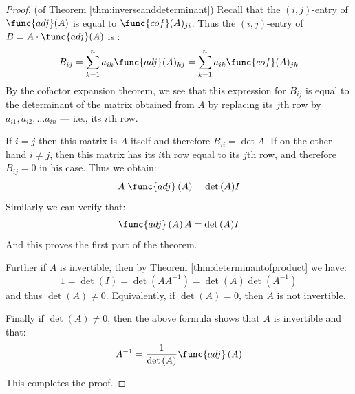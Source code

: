 \begin{proof} (of Theorem \ref{thm:inverseanddeterminant})
Recall that the $(i,j)$-entry of $\func{adj}(A)$ is equal to $\func{cof}(A)_{ji}$.  Thus the $(i,j)$-entry of   $B=A\cdot \func{adj}(A)$ is : 
\[
B_{ij}=\sum_{k=1}^n a_{ik} \func{adj} (A)_{kj}= \sum_{k=1}^n a_{ik} \func{cof} (A)_{jk}
\]
By the cofactor expansion theorem, we see that this expression for $B_{ij}$ is equal to the determinant of the
matrix obtained from $A$ by replacing its $j$th  row  by $a_{i1}, a_{i2}, \dots a_{in}$ --- i.e., its $i$th row. 

If $i=j$ then this matrix is $A$ itself and therefore $B_{ii}=\det
A$. If on the other hand $i\neq j$, then this matrix has its $i$th row
equal to its $j$th row, and therefore $B_{ij}=0$ in his case. Thus we obtain: 
\begin{equation*}
A \; \func{adj}\left(A\right) = {\det \left(A\right)} I
\end{equation*}
Similarly we can verify that:
\begin{equation*}
\func{adj}\left(A\right)A = {\det \left(A\right)} I
\end{equation*}
And this proves the first part of the theorem. 

Further if $A$ is  invertible, then by Theorem \ref{thm:determinantofproduct} we have:
\[ 1 = \det \left( I \right) = \det \left( A A^{-1} \right) = \det \left( A \right) \det \left( A^{-1} \right) \]
and thus $\det \left( A \right) \neq 0$. Equivalently, if  $\det \left( A \right) = 0$, then $A$ is not invertible. 

Finally if $\det \left( A \right) \neq 0$, then the above formula shows that $A$ is invertible and that:
\begin{equation*}
A^{-1} = \frac{1}{\det \left(A\right)} \func{adj}\left(A\right)
\end{equation*}

This completes the proof.
\end{proof}

